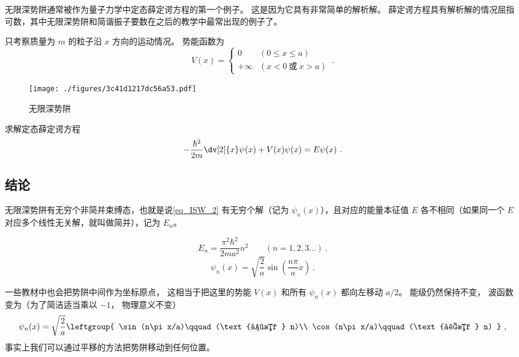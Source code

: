 

无限深势阱通常被作为量子力学中定态薛定谔方程的第一个例子。 这是因为它具有非常简单的解析解。 薛定谔方程具有解析解的情况屈指可数，其中无限深势阱和简谐振子要数在之后的教学中最常出现的例子了。

只考察质量为 $m$ 的粒子沿 $x$ 方向的运动情况。%
势能函数为
\begin{equation}
V(x) =
\begin{cases}
0 \quad &(0 \leqslant x \leqslant a)\\
+\infty  &(x < 0 \ \text{或}\  x > a)
\end{cases}~.
\end{equation}

\begin{figure}[ht]
\centering
\texttt{[image: ./figures/3c41d1217dc56a53.pdf]}
\caption{无限深势阱} \label{fig_ISW_1}
\end{figure}
求解定态薛定谔方程
\begin{equation}\label{eq_ISW_2}
-\frac{\hbar ^2}{2m} \dv[2]{x} \psi(x) + V(x)\psi(x) = E\psi(x)~.
\end{equation} 

\subsection{结论} 
无限深势阱有无穷个非简并束缚态，也就是说\autoref{eq_ISW_2} 有无穷个解（记为 $\psi_n(x)$），且对应的能量本征值 $E$ 各不相同（如果同一个 $E$ 对应多个线性无关解，就叫做简并），记为 $E_n$。

\begin{equation}\label{eq_ISW_3}
E_n = \frac{\pi^2 \hbar^2}{2m a^2} n^2 \qquad (n = 1,2,3\dots)~.
\end{equation}
\begin{equation}\label{eq_ISW_1}
\psi_n(x) = \sqrt{\frac{2}{a}} \sin(\frac{n\pi }{a} x)~.
\end{equation}

一些教材中也会把势阱中间作为坐标原点， 这相当于把这里的势能 $V(x)$ 和所有 $\psi_n(x)$ 都向左移动 $a/2$。 能级仍然保持不变， 波函数变为（为了简洁适当乘以 $-1$， 物理意义不变）
\begin{equation}
\psi_n(x) = \sqrt{\frac{2}{a}}\leftgroup{
    \sin(n\pi x/a)\qquad (\text{偶数 } n)\\
    \cos(n\pi x/a)\qquad (\text{奇数 } n)
}~,
\end{equation}
事实上我们可以通过平移的方法把势阱移动到任何位置。

